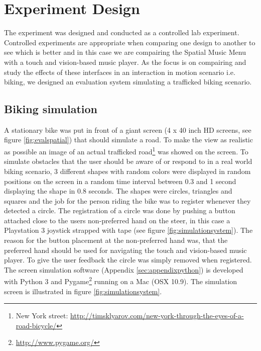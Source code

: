 \section{Experiment Design}
The experiment was designed and conducted as a controlled lab experiment. Controlled experiments are appropriate when comparing one design to another to see which is better \cite{benyon_designing_2010} and in this case we are compairing the Spatial Music Menu with a touch and vision-based music player. As the focus is on compairing and study the effects of these interfaces in an interaction in motion scenario i.e. biking, we designed an evaluation system simulating a trafficked biking scenario.

\subsection{Biking simulation}
A stationary bike was put in front of a giant screen (4 x 40 inch HD screens, see figure \ref{fig:evalspatial}) that should simulate a road. To make the view as realistic as possible an image of an actual trafficked road\footnote{New York street: \url{http://timsklyarov.com/new-york-through-the-eyes-of-a-road-bicycle/}} was showed on the screen. To simulate obstacles that the user should be aware of or respond to in a real world biking scenario, 3 different shapes with random colors were displayed in random positions on the screen in a random time interval between 0.3 and 1 second displaying the shape in 0.8 seconds. The shapes were circles, triangles and squares and the job for the person riding the bike was to register whenever they detected a circle. The registration of a circle was done by pushing a button attached close to the users non-preferred hand on the steer, in this case a Playstation 3 joystick strapped with tape (see figure \ref{fig:simulationsystem}). The reason for the button placement at the non-preferred hand was, that the preferred hand should be used for navigating the touch and vision-based music player. To give the user feedback the circle was simply removed when registered. The screen simulation software (Appendix \ref{sec:appendixpython}) is developed with Python 3 and Pygame\footnote{\url{http://www.pygame.org/}} running on a Mac (OSX 10.9). The simulation screen is illustrated in figure \ref{fig:simulationsystem}.

